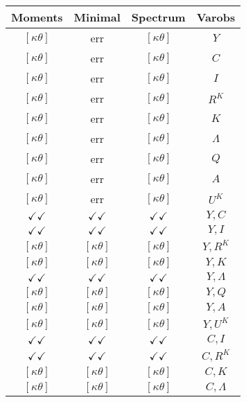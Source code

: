 \documentclass[a4paper,10pt]{article}
\begin{document}
\centering
\begin{longtable}{|c|c|c|c|}
\hline
Moments & Minimal & Spectrum & Varobs \\
\hline
$[\kappa \theta ]$ & err & $[\kappa \theta ]$ & ${Y}$ \\
\hline
$[\kappa \theta ]$ & err & $[\kappa \theta ]$ & ${C}$ \\
\hline
$[\kappa \theta ]$ & err & $[\kappa \theta ]$ & ${I}$ \\
\hline
$[\kappa \theta ]$ & err & $[\kappa \theta ]$ & ${R^{K}}$ \\
\hline
$[\kappa \theta ]$ & err & $[\kappa \theta ]$ & ${K}$ \\
\hline
$[\kappa \theta ]$ & err & $[\kappa \theta ]$ & ${\Lambda}$ \\
\hline
$[\kappa \theta ]$ & err & $[\kappa \theta ]$ & ${Q}$ \\
\hline
$[\kappa \theta ]$ & err & $[\kappa \theta ]$ & ${A}$ \\
\hline
$[\kappa \theta ]$ & err & $[\kappa \theta ]$ & ${U^K}$ \\
\hline
$\checkmark\checkmark$ & $\checkmark\checkmark$ & $\checkmark\checkmark$ & ${Y},{C}$ \\
\hline
$\checkmark\checkmark$ & $\checkmark\checkmark$ & $\checkmark\checkmark$ & ${Y},{I}$ \\
\hline
$[\kappa \theta ]$ & $[\kappa \theta ]$ & $[\kappa \theta ]$ & ${Y},{R^{K}}$ \\
\hline
$[\kappa \theta ]$ & $[\kappa \theta ]$ & $[\kappa \theta ]$ & ${Y},{K}$ \\
\hline
$\checkmark\checkmark$ & $\checkmark\checkmark$ & $\checkmark\checkmark$ & ${Y},{\Lambda}$ \\
\hline
$[\kappa \theta ]$ & $[\kappa \theta ]$ & $[\kappa \theta ]$ & ${Y},{Q}$ \\
\hline
$[\kappa \theta ]$ & $[\kappa \theta ]$ & $[\kappa \theta ]$ & ${Y},{A}$ \\
\hline
$[\kappa \theta ]$ & $[\kappa \theta ]$ & $[\kappa \theta ]$ & ${Y},{U^K}$ \\
\hline
$\checkmark\checkmark$ & $\checkmark\checkmark$ & $\checkmark\checkmark$ & ${C},{I}$ \\
\hline
$\checkmark\checkmark$ & $\checkmark\checkmark$ & $\checkmark\checkmark$ & ${C},{R^{K}}$ \\
\hline
$[\kappa \theta ]$ & $[\kappa \theta ]$ & $[\kappa \theta ]$ & ${C},{K}$ \\
\hline
$[\kappa \theta ]$ & $[\kappa \theta ]$ & $[\kappa \theta ]$ & ${C},{\Lambda}$ \\

\end{longtable}
\end{document}
